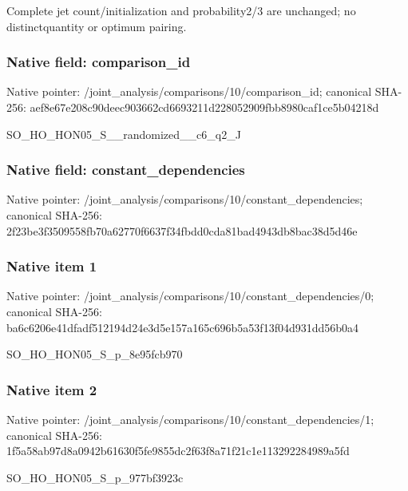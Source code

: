 \documentclass[10pt,a4paper]{article}
\begin{document}
\begingroup\raggedright\sloppy Complete jet count/\allowbreak{}initialization and probability2/\allowbreak{}3 are unchanged;\allowbreak{} no distinctquantity or optimum pairing.\par\endgroup

\subsubsection{Native field: comparison\_\allowbreak{}id}
Native pointer: /joint\_\allowbreak{}analysis/comparisons/10/comparison\_\allowbreak{}id; canonical SHA-256: aef8e67e208c90deec903662cd6693211d228052909fbb8980caf1ce5b04218d

\begingroup\raggedright\sloppy SO\_\allowbreak{}HO\_\allowbreak{}HON05\_\allowbreak{}S\_\allowbreak{}\_\allowbreak{}randomized\_\allowbreak{}\_\allowbreak{}c6\_\allowbreak{}q2\_\allowbreak{}J\par\endgroup

\subsubsection{Native field: constant\_\allowbreak{}dependencies}
Native pointer: /joint\_\allowbreak{}analysis/comparisons/10/constant\_\allowbreak{}dependencies; canonical SHA-256: 2f23be3f3509558fb70a62770f6637f34fbdd0cda81bad4943db8bac38d5d46e

\subsubsection{Native item 1}
Native pointer: /joint\_\allowbreak{}analysis/comparisons/10/constant\_\allowbreak{}dependencies/0; canonical SHA-256: ba6c6206e41dfadf512194d24e3d5e157a165c696b5a53f13f04d931dd56b0a4

\begingroup\raggedright\sloppy SO\_\allowbreak{}HO\_\allowbreak{}HON05\_\allowbreak{}S\_\allowbreak{}p\_\allowbreak{}8e95fcb970\par\endgroup

\subsubsection{Native item 2}
Native pointer: /joint\_\allowbreak{}analysis/comparisons/10/constant\_\allowbreak{}dependencies/1; canonical SHA-256: 1f5a58ab97d8a0942b61630f5fe9855dc2f63f8a71f21c1e113292284989a5fd

\begingroup\raggedright\sloppy SO\_\allowbreak{}HO\_\allowbreak{}HON05\_\allowbreak{}S\_\allowbreak{}p\_\allowbreak{}977bf3923c\par\endgroup
\end{document}
